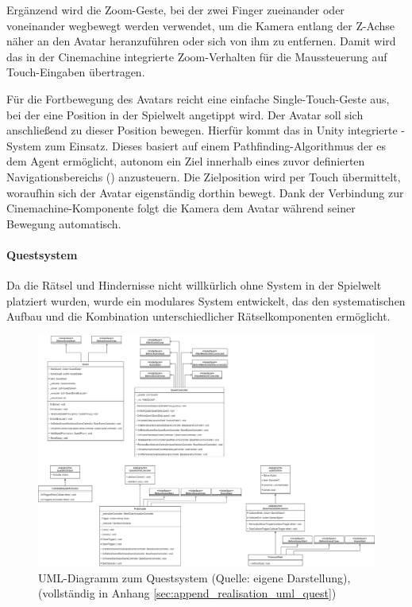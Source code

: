 Ergänzend wird die Zoom-Geste, bei der zwei Finger zueinander oder voneinander wegbewegt werden verwendet, um die Kamera entlang der Z-Achse näher an den Avatar heranzuführen oder sich von ihm zu entfernen. Damit wird das in der Cinemachine integrierte Zoom-Verhalten für die Maussteuerung auf Touch-Eingaben übertragen.

Für die Fortbewegung des Avatars reicht eine einfache Single-Touch-Geste aus, bei der eine Position in der Spielwelt angetippt wird. Der Avatar soll sich anschließend zu dieser Position bewegen. Hierfür kommt das in Unity integrierte -System zum Einsatz. Dieses basiert auf einem Pathfinding-Algorithmus der es dem Agent ermöglicht, autonom ein Ziel innerhalb eines zuvor definierten Navigationsbereichs () anzusteuern. Die Zielposition wird per Touch übermittelt, woraufhin sich der Avatar eigenständig dorthin bewegt. Dank der Verbindung zur Cinemachine-Komponente folgt die Kamera dem Avatar während seiner Bewegung automatisch.

\paragraph{Questsystem}\label{sec:quest-system}

Da die Rätsel und Hindernisse nicht willkürlich ohne System in der Spielwelt platziert wurden, wurde ein modulares System entwickelt, das den systematischen Aufbau und die Kombination unterschiedlicher Rätselkomponenten ermöglicht.

\begin{figure}[ht]
\centering
\includegraphics[width=1\linewidth]{content/pictures/QuestSystem.drawio.png}
\caption{UML-Diagramm zum Questsystem (Quelle: eigene Darstellung), (vollständig in Anhang \ref{sec:append_realisation_uml_quest})}
\label{fig:quest-system-uml}
\end{figure}


